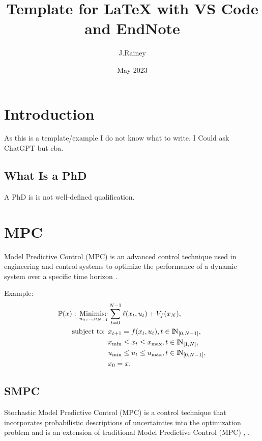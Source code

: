 \documentclass[onecolumn]{IEEEconf}
\title{Template for LaTeX with VS Code and EndNote}
\author{J.Rainey}
\date{May 2023}
\begin{document}
\maketitle


\section{Introduction}
As this is a template/example I do not know what to write. I Could ask ChatGPT but cba.

\subsection{What Is a PhD}
A PhD is is  not well-defined qualification\cite{RN6}. 

\section{MPC}
Model Predictive Control (MPC) is an advanced control technique used in engineering and control systems 
to optimize the performance of a dynamic system over a specific time horizon \cite{RN1}.

Example:
\begin{subequations}
    \begin{align}
        \mathbb{P}(x)
        {}:{}
        \operatorname*{Minimise}_{u_0, \ldots, u_{N-1}}
        &
        \sum_{t=0}^{N-1} \ell(x_t, u_t) + V_f(x_N),
        \\
        \text{subject to: }
        &
        x_{t+1} {}={} f(x_t, u_t), t\in {\rm I\!N}_{[0, N-1]},
        \\
        &
        x_{\min} \leq x_t \leq x_{\max}, t\in{\rm I\!N}_{[1, N]},
        \\
        &
        u_{\min} \leq u_t \leq u_{\max}, t\in{\rm I\!N}_{[0, N-1]},
        \\
        &
        x_0 = x.
    \end{align}
\end{subequations}



\subsection{SMPC}
Stochastic Model Predictive Control (MPC) is a control technique that incorporates probabilistic 
descriptions of uncertainties into the optimization problem and is an extension of traditional 
Model Predictive Control (MPC) \cite{RN8}, \cite{RN3}.  



\end{document}
